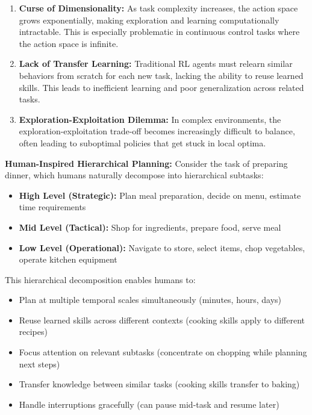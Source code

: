 \documentclass[12pt]{article}
\begin{document}
{{\begin{enumerate}
    \item \textbf{Curse of Dimensionality:} As task complexity increases, the action space grows exponentially, making exploration and learning computationally intractable. This is especially problematic in continuous control tasks where the action space is infinite.
    
    \item \textbf{Lack of Transfer Learning:} Traditional RL agents must relearn similar behaviors from scratch for each new task, lacking the ability to reuse learned skills. This leads to inefficient learning and poor generalization across related tasks.
    
    \item \textbf{Exploration-Exploitation Dilemma:} In complex environments, the exploration-exploitation trade-off becomes increasingly difficult to balance, often leading to suboptimal policies that get stuck in local optima.
\end{enumerate}

\textbf{Human-Inspired Hierarchical Planning:}
Consider the task of preparing dinner, which humans naturally decompose into hierarchical subtasks:
\begin{itemize}
    \item \textbf{High Level (Strategic):} Plan meal preparation, decide on menu, estimate time requirements
    \item \textbf{Mid Level (Tactical):} Shop for ingredients, prepare food, serve meal
    \item \textbf{Low Level (Operational):} Navigate to store, select items, chop vegetables, operate kitchen equipment
\end{itemize}

This hierarchical decomposition enables humans to:
\begin{itemize}
    \item Plan at multiple temporal scales simultaneously (minutes, hours, days)
    \item Reuse learned skills across different contexts (cooking skills apply to different recipes)
    \item Focus attention on relevant subtasks (concentrate on chopping while planning next steps)
    \item Transfer knowledge between similar tasks (cooking skills transfer to baking)
    \item Handle interruptions gracefully (can pause mid-task and resume later)
\end{itemize}

}}
\end{document}
